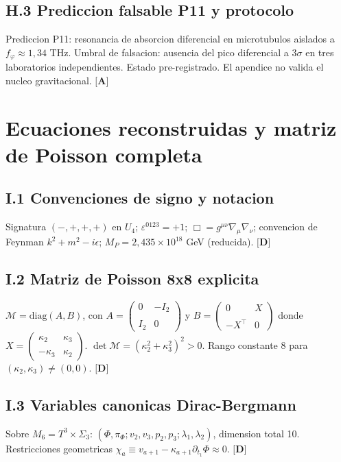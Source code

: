 ﻿\documentclass[11pt,letterpaper]{article}
\begin{document}
\subsection{H.3 Prediccion falsable P11 y protocolo}
Prediccion P11: resonancia de absorcion diferencial en microtubulos aislados a $f_\varphi \approx 1{,}34$ THz. Umbral de falsacion: ausencia del pico diferencial a $3\sigma$ en tres laboratorios independientes. Estado pre-registrado. El apendice no valida el nucleo gravitacional. $\textbf{[A]}$
\section{Ecuaciones reconstruidas y matriz de Poisson completa}
\subsection{I.1 Convenciones de signo y notacion}
Signatura $(-,+,+,+)$ en $U_4$; $\varepsilon^{0123} = +1$; $\Box = g^{\mu\nu}\nabla_\mu\nabla_\nu$; convencion de Feynman $k^2 + m^2 - i\epsilon$; $M_P = 2{,}435 \times 10^{18}$ GeV (reducida). $\textbf{[D]}$
\subsection{I.2 Matriz de Poisson 8x8 explicita}
$\mathcal{M} = \mathrm{diag}(A, B)$, con $A = \begin{pmatrix} 0 & -I_2 \\\\ I_2 & 0 \end{pmatrix}$ y $B = \begin{pmatrix} 0 & X \\\\ -X^\top & 0 \end{pmatrix}$ donde $X = \begin{pmatrix} \kappa_2 & \kappa_3 \\\\ -\kappa_3 & \kappa_2 \end{pmatrix}$. $\det\mathcal{M} = (\kappa_2^2 + \kappa_3^2)^2 > 0$. Rango constante 8 para $(\kappa_2, \kappa_3) \neq (0,0)$. $\textbf{[D]}$
\subsection{I.3 Variables canonicas Dirac-Bergmann}
Sobre $M_6 = T^3 \times \Sigma_3$: $(\Phi, \pi_\Phi; v_2, v_3, p_2, p_3; \lambda_1, \lambda_2)$, dimension total 10. Restricciones geometricas $\chi_a \equiv v_{a+1} - \kappa_{a+1}\partial_{t_1}\Phi \approx 0$. $\textbf{[D]}$
\end{document}
